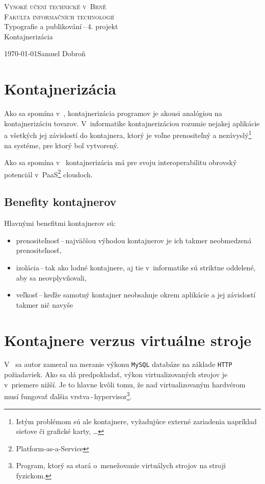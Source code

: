 \documentclass[11pt, a4paper]{article}
\begin{document}
	\begin{titlepage}
		\begin{center}
				\Huge{\textsc{Vysoké učení technické v~Brně}}\\
				\huge{\textsc{Fakulta informačních technologií}}
			\\
			\LARGE{Typografie a publikování\,--\,4. projekt}\\
			\Huge{Kontajnerizácia}
		\end{center}
    	{\Large \today \hfill Samuel Dobroň}
	\end{titlepage}

\section{Kontajnerizácia}
    Ako sa spomína v~\cite{Clancy:2021:WhatAreContainers}, kontajnerizácia programov je akousi analógiou na kontajnerizáciu tovarov. V~informatike kontajnerizáciou rozumie
     nejakej aplikácie a všetkých jej závislostí do kontajnera, ktorý je
    voľne prenositeľný a nezávyslý\footnote{Istým problémom sú ale kontajnere, vyžadujúce externé zariadenia napríklad sieťove či grafické karty, \dots} na systéme, pre ktorý bol vytvorený. 

    Ako sa spomína v~\cite{Pahl:2015:PaaS} kontajnerizácia má pre svoju interoperabilitu obrovský potenciál v~PaaS\footnote{Platform-as-a-Service} cloudoch.

	\subsection{Benefity kontajnerov}
	Hlavnými benefitmi kontajnerov sú:
	\begin{itemize}
	    \item prenositeľnosť\,--\,najväčšou výhodou kontajnerov je ich takmer neobmedzená prenositeľnosť,
	    \item izolácia\,--\,tak ako lodné kontajnere, aj tie v~informatike sú striktne oddelené, aby sa neovplyvňovali,
	    \item veľkosť\,--\,keďže samotný kontajner neobsahuje okrem aplikácie a jej závislostí takmer nič navyše
	\end{itemize}
	
\section{Kontajnere verzus virtuálne stroje}
    V~\cite{AspernasNensen:2016:COntainersPerformance} sa autor zameral na meranie výkonu \texttt{MySQL} databáze na základe \texttt{HTTP} požiadaviek.
    Ako sa dá predpokladať, výkon virtualizovaných strojov je v~priemere nižší. Je to hlavne kvôli tomu, že nad virtualizovaným hardvérom musí fungovať ďalšia vrstva\,-\,hypervisor\footnote{Program, ktorý sa stará o~menežovanie virtuálych strojov na stroji fyzickom.}.
    
\end{document}
